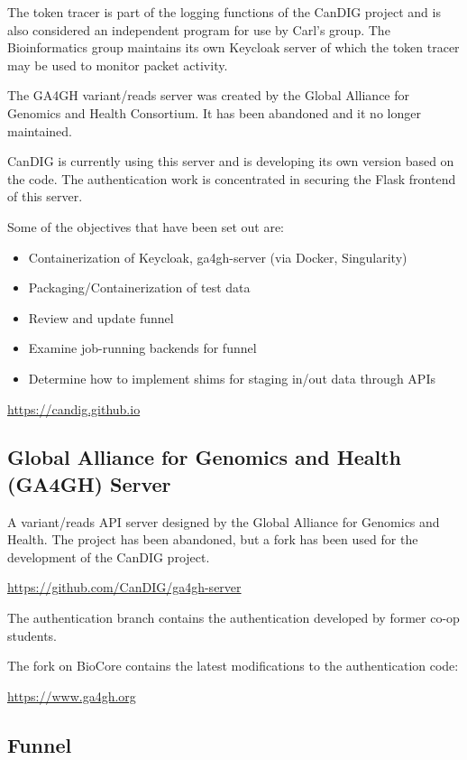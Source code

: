 \documentclass{article}
\begin{document}
The token tracer is part of the logging functions of the CanDIG project and is also considered an independent program for use by Carl's group. The Bioinformatics group maintains its own Keycloak server of which the token
tracer may be used to monitor packet activity.

The GA4GH variant/reads server was created by the Global Alliance for Genomics and Health Consortium. It has been abandoned and it no longer maintained.

CanDIG is currently using this server and is developing its own version based on the code. The authentication work is concentrated in securing the Flask frontend of this server.

Some of the objectives that have been set out are:

\begin{itemize}
\item Containerization of Keycloak, ga4gh-server (via Docker, Singularity)
\item Packaging/Containerization of test data
\item Review and update funnel
\item Examine job-running backends for funnel
\item Determine how to implement shims for staging in/out data through APIs
\end{itemize}

\url{https://candig.github.io}

\subsection{Global Alliance for Genomics and Health (GA4GH) Server}

A variant/reads API server designed by 
the Global Alliance for Genomics and Health.
The project has been abandoned, but a fork has been used
for the development of the CanDIG project.

\url{https://github.com/CanDIG/ga4gh-server}

The authentication branch contains the authentication
developed by former co-op students.

The fork on BioCore contains the latest modifications
to the authentication code:

\url{https://www.ga4gh.org}

\subsection{Funnel}
\end{document}
